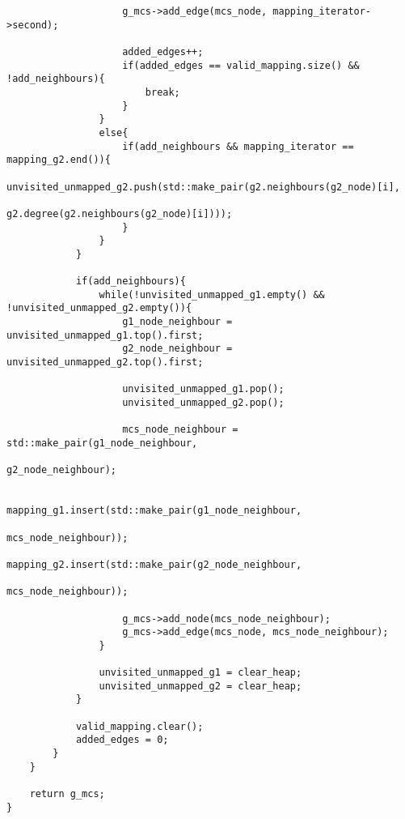 \begin{lstlisting}
                    g_mcs->add_edge(mcs_node, mapping_iterator->second);

                    added_edges++;
                    if(added_edges == valid_mapping.size() && !add_neighbours){
                        break;
                    }
                }
                else{
                    if(add_neighbours && mapping_iterator == mapping_g2.end()){
                        unvisited_unmapped_g2.push(std::make_pair(g2.neighbours(g2_node)[i],
                                                   g2.degree(g2.neighbours(g2_node)[i])));
                    }
                }
            }

            if(add_neighbours){
                while(!unvisited_unmapped_g1.empty() && !unvisited_unmapped_g2.empty()){
                    g1_node_neighbour = unvisited_unmapped_g1.top().first;
                    g2_node_neighbour = unvisited_unmapped_g2.top().first;

                    unvisited_unmapped_g1.pop();
                    unvisited_unmapped_g2.pop();

                    mcs_node_neighbour = std::make_pair(g1_node_neighbour,
                                                        g2_node_neighbour);

                    mapping_g1.insert(std::make_pair(g1_node_neighbour,
                                                     mcs_node_neighbour));
                    mapping_g2.insert(std::make_pair(g2_node_neighbour,
                                                     mcs_node_neighbour));

                    g_mcs->add_node(mcs_node_neighbour);
                    g_mcs->add_edge(mcs_node, mcs_node_neighbour);
                }

                unvisited_unmapped_g1 = clear_heap;
                unvisited_unmapped_g2 = clear_heap;
            }

            valid_mapping.clear();
            added_edges = 0;
        }
    }

    return g_mcs;
}

\end{lstlisting}
